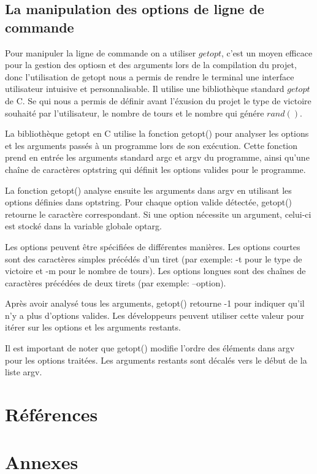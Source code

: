 \documentclass[a4paper]{article}
\begin{document}
\subsection{La manipulation des options de ligne de commande}


Pour manipuler la ligne de commande on a utiliser $getopt$, c'est un moyen efficace pour la gestion des optiosn et des arguments lors de la compilation du projet, donc l'utilisation de getopt nous a permis de rendre le terminal une interface utilisateur intuisive et personnalisable. Il utilise une bibliothèque standard $getopt$ de C. Se qui nous a permis de définir avant l'éxusion du projet le type de victoire souhaité par l'utilisateur, le nombre de tours et le nombre qui génére $rand()$. 

La bibliothèque getopt en C utilise la fonction getopt() pour analyser les options et les arguments passés à un programme lors de son exécution. Cette fonction prend en entrée les arguments standard argc et argv du programme, ainsi qu'une chaîne de caractères optstring qui définit les options valides pour le programme.

La fonction getopt() analyse ensuite les arguments dans argv en utilisant les options définies dans optstring. Pour chaque option valide détectée, getopt() retourne le caractère correspondant. Si une option nécessite un argument, celui-ci est stocké dans la variable globale optarg.

Les options peuvent être spécifiées de différentes manières. Les options courtes sont des caractères simples précédés d'un tiret (par exemple: -t pour le type de victoire et -m pour le nombre de tours). Les options longues sont des chaînes de caractères précédées de deux tirets (par exemple: --option).

Après avoir analysé tous les arguments, getopt() retourne -1 pour indiquer qu'il n'y a plus d'options valides. Les développeurs peuvent utiliser cette valeur pour itérer sur les options et les arguments restants.

Il est important de noter que getopt() modifie l'ordre des éléments dans argv pour les options traitées. Les arguments restants sont décalés vers le début de la liste argv.

\section{Références}


\section{Annexes}
\end{document}
